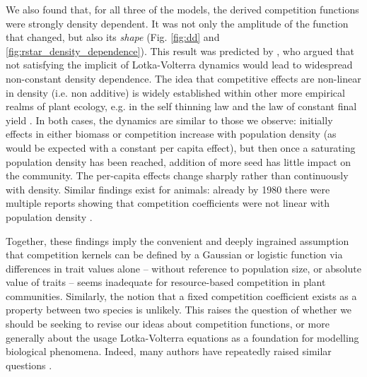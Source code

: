 \documentclass[a4paper,11pt]{article}
\begin{document}
We also found that, for all three of the models, the derived
competition functions were strongly density dependent. It was not only
the amplitude of the function that changed, but also its \emph{shape}
(Fig. \ref{fig:dd} and \ref{fig:rstar_density_dependence}).
%
This result was predicted by \citet{Abrams-1980}, who argued that not
satisfying the implicit of Lotka-Volterra dynamics would lead to
widespread non-constant density dependence. The idea that competitive
effects are non-linear in density (i.e. non additive) is widely
established within other more empirical realms of plant ecology, e.g.
in the self thinning law and the law of constant
final yield \citep{Harper-1977}.
In both cases, the dynamics are similar to those we observe: initially
effects in either biomass or competition increase with population
density (as would be expected with a constant per capita effect), but
then once a saturating population density has been reached, addition
of more seed has little impact on the community. The
per-capita effects change sharply rather than continuously with density. Similar findings exist
for animals: already by 1980 there were multiple reports showing that
competition coefficients were not linear with population density
\citep{Abrams-1980}.

Together, these findings imply the convenient and deeply ingrained assumption that
competition kernels can be defined by  a Gaussian or logistic function
via differences in trait values
alone -- without reference to population size, or absolute value of
traits -- seems inadequate for resource-based competition in plant
communities.
%
Similarly, the notion that a fixed competition coefficient exists as a
property between two species is unlikely. This raises the question of
whether we should be seeking to revise our ideas about competition
functions, or more generally about the usage Lotka-Volterra equations as
a foundation for modelling biological phenomena.  Indeed, many authors
have repeatedly raised similar questions \citep[e.g.][]{Andrewartha-1953,
  Neill-1974, Abrams-1975, Wangersky-1978,Abrams-1980, Tilman-1987,
  Abrams-2008}.
\end{document}
